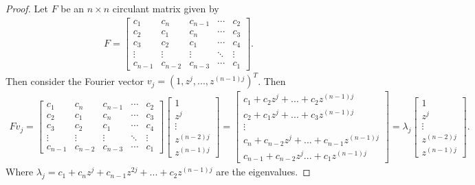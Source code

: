 \documentclass[leqno]{article}
\theoremstyle{nonumberplain}
\newtheorem{proof}{Proof}
\begin{document}
\begin{proof} 
Let $F$ be an $n\times n$ circulant matrix given by
\begin{align*}F=
\begin{bmatrix}
c_1 & c_n & c_{n-1} & \cdots & c_2\\
c_2 & c_1 & c_{n} & \cdots & c_3\\
c_3 & c_2 & c_1 & \cdots & c_4\\
\vdots & \vdots & \vdots &  \ddots & \vdots\\
c_{n-1} & c_{n-2} & c_{n-3} & \cdots & c_1
\end{bmatrix}.
\end{align*}
Then consider the Fourier vector $v_j = (1,z^j,...,z^{(n-1)j})^T$. Then 
\begin{align*}
Fv_j = 
\begin{bmatrix}
c_1 & c_n & c_{n-1} & \cdots & c_2\\
c_2 & c_1 & c_{n} & \cdots & c_3\\
c_3 & c_2 & c_1 & \cdots & c_4\\
\vdots & \vdots & \vdots &  \ddots & \vdots\\
c_{n-1} & c_{n-2} & c_{n-3} & \cdots & c_1
\end{bmatrix}
\begin{bmatrix}
1\\
z^j\\
\vdots\\
z^{(n-2)j}\\
z^{(n-1)j}
\end{bmatrix}
= 
\begin{bmatrix}
c_1+c_2 z^j+ ...+c_2 z^{(n-1)j}\\
c_2+c_1z^j+...+c_3z^{(n-1)j}\\
\vdots\\
c_{n} + c_{n-2}z^j+...+c_{n-1}z^{(n-1)j}\\
c_{n-1}+c_{n-2}z^j...+c_1z^{(n-1)j}
\end{bmatrix}
=\lambda_j
\begin{bmatrix}
1\\
z^j\\
\vdots\\
z^{(n-2)j}\\
z^{(n-1)j}
\end{bmatrix}.
\end{align*}
Where $\lambda_j=c_1+c_{n}z^j+c_{n-1}z^{2j}+...+c_2z^{(n-1)j}$ are the eigenvalues.
\end{proof}

\pagebreak
\end{document}
